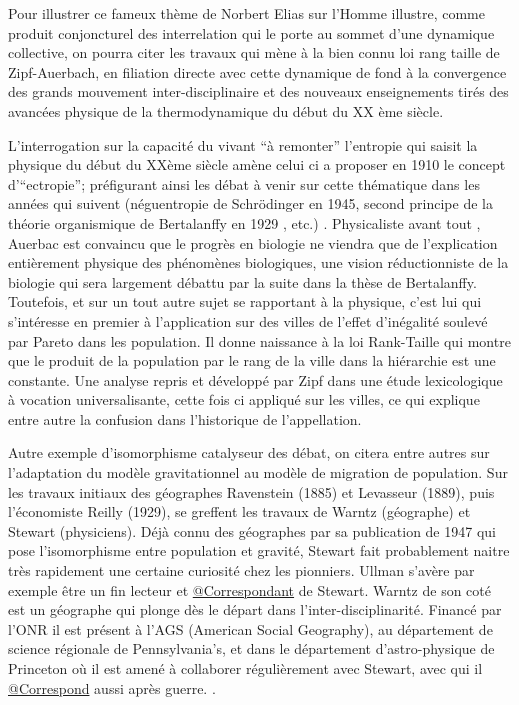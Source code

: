 Pour illustrer ce fameux thème de Norbert Elias \autocite[31-33]{Delmotte2010} \textcite{Elias1991} sur l'Homme illustre, comme produit conjoncturel des interrelation qui le porte au sommet d'une dynamique collective, on pourra citer les travaux qui mène à la bien connu loi rang taille de Zipf-Auerbach, en filiation directe avec cette dynamique de fond à la convergence des grands mouvement inter-disciplinaire et des nouveaux enseignements tirés des avancées physique de la thermodynamique du début du XX ème siècle.

L'interrogation sur la capacité du vivant \enquote{à remonter} l'entropie qui saisit la physique du début du XXème siècle amène celui ci a proposer en 1910 le concept d'\enquote{ectropie}; préfigurant ainsi les débat à venir sur cette thématique dans les années qui suivent (néguentropie de Schrödinger en 1945, second principe de la théorie organismique de Bertalanffy en 1929 \autocite[475]{Pouvreau2013}, etc.) \autocite[80]{Pouvreau2013}. Physicaliste avant tout \autocite[87]{Pouvreau2013}, Auerbac est convaincu que le progrès en biologie ne viendra que de l'explication entièrement physique des phénomènes biologiques, une vision réductionniste de la biologie qui sera largement débattu par la suite dans la thèse de Bertalanffy. Toutefois, et sur un tout autre sujet se rapportant à la physique, c'est lui qui s’intéresse en premier à l'application sur des villes de l'effet d'inégalité soulevé par Pareto dans les population.\autocite[94]{Rosser2011} Il donne naissance à la loi Rank-Taille qui montre que le produit de la population par le rang de la ville dans la hiérarchie est une constante. Une analyse repris et développé par Zipf dans une étude lexicologique à vocation universalisante, cette fois ci appliqué sur les villes, ce qui explique entre autre la confusion dans l’historique de l’appellation.

Autre exemple d'isomorphisme catalyseur des débat, on citera entre autres sur l'adaptation du modèle gravitationnel au modèle de migration de population. Sur les travaux initiaux des géographes Ravenstein (1885) et Levasseur (1889), puis l'économiste Reilly (1929), se greffent les travaux de Warntz (géographe) et Stewart (physiciens). Déjà connu des géographes par sa publication de 1947 qui pose l'isomorphisme entre population et gravité, Stewart fait probablement naitre très rapidement une certaine curiosité chez les pionniers. Ullman s'avère par exemple être un fin lecteur \autocite[61]{Glick1988} et \href{http://nwda.orbiscascade.org/ark:/80444/xv01385}{@Correspondant} de Stewart. Warntz de son coté est un géographe qui plonge dès le départ dans l'inter-disciplinarité. Financé par l'ONR il est présent à l'AGS (American Social Geography), au département de science régionale de Pennsylvania's, et dans le département d'astro-physique de Princeton où il est amené à collaborer régulièrement avec Stewart, avec qui il \href{http://rmc.library.cornell.edu/EAD/htmldocs/RMM04392.html}{@Correspond} aussi après guerre. \autocite{Barnes2006}. 

